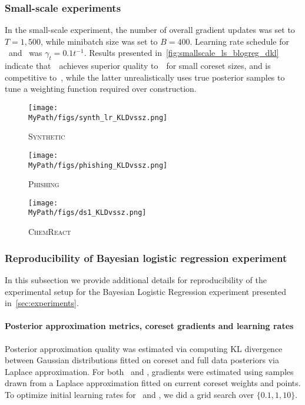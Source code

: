 \subsubsection{Small-scale experiments}
\label{app:small_scale_appendix}
In the small-scale experiment, the number of overall gradient updates was
set to $T = 1,500$, while minibatch size was set to  $B = 400$. Learning rate schedule for \sparsevi~and \psvi~was ${\gamma_t = 0.1t^{-1}}$. Results presented in~\cref{fig:smallscale_ls_blogreg_dkl} indicate that~\psvi~achieves superior quality to~\sparsevi~for small coreset sizes, and is competitive to~\gigao, while the latter unrealistically uses true posterior samples to tune a weighting function required over construction.


\begin{figure*}[!t]
	\centering
	\begin{subfigure}[b]{.29\textwidth}
		\caption*{\textsc{Synthetic}}
		\vspace*{-0.3cm}
		\centerline{\texttt{[image: \\MyPath/figs/synth\_lr\_KLDvssz.png]}}%
	\end{subfigure}\hfill\qquad
	\centering
	\begin{subfigure}[b]{.29\textwidth}
		\caption*{\textsc{Phishing}}
		\vspace*{-0.3cm}
		\centerline{\texttt{[image: \\MyPath/figs/phishing\_KLDvssz.png]}}%
	\end{subfigure}\hfill\qquad
	\centering
	\begin{subfigure}[b]{.29\textwidth}
		\caption*{\textsc{ChemReact}}
		\vspace*{-0.3cm}
		\centerline{\texttt{[image: \\MyPath/figs/ds1\_KLDvssz.png]}}%
	\end{subfigure}
	\caption{Comparison of (pseudo)coreset approximate posterior
		quality vs  coreset
		size for logistic regression over 10 trials.}
	\label{fig:smallscale_ls_blogreg_dkl}
\end{figure*}

\subsubsection{Reproducibility of Bayesian logistic regression experiment}
\label{app:reproducibility}
In this subsection we provide additional details for reproducibility of the experimental setup for the Bayesian Logistic Regression experiment presented in~\cref{sec:experiments}.  

\paragraph{Posterior approximation metrics, coreset gradients and learning rates} Posterior approximation quality was estimated via computing KL divergence between Gaussian distributions fitted on coreset and full data posteriors via Laplace approximation. For both \sparsevi~and \psvi, gradients were estimated using samples drawn from a Laplace approximation fitted on current coreset weights
and points. To optimize initial learning rates for \sparsevi~and \psvi, we did a grid search over ${\{0.1, 1, 10\}}$.

